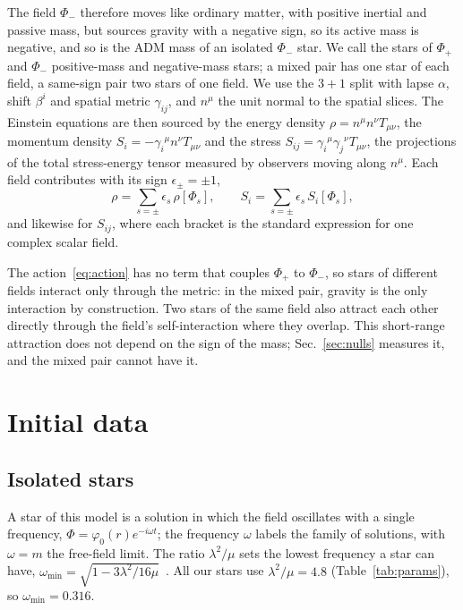 \documentclass[twocolumn,floatfix,aps,prd,superscriptaddress,nofootinbib]{revtex4-2}
\begin{document}
The field $\Phi_-$ therefore moves like ordinary matter, with positive inertial and passive mass, but sources gravity with a negative sign, so its active mass is negative, and so is the ADM mass of an isolated $\Phi_-$ star. We call the stars of $\Phi_+$ and $\Phi_-$ positive-mass and negative-mass stars; a mixed pair has one star of each field, a same-sign pair two stars of one field. We use the $3{+}1$ split with lapse $\alpha$, shift $\beta^i$ and spatial metric $\gamma_{ij}$, and $n^\mu$ the unit normal to the spatial slices. The Einstein equations are then sourced by the energy density $\rho=n^\mu n^\nu T_{\mu\nu}$, the momentum density $S_i=-\gamma_i{}^\mu n^\nu T_{\mu\nu}$ and the stress $S_{ij}=\gamma_i{}^\mu\gamma_j{}^\nu T_{\mu\nu}$, the projections of the total stress-energy tensor measured by observers moving along $n^\mu$. Each field contributes with its sign $\epsilon_\pm=\pm1$,
\begin{equation}
\rho=\sum_{s=\pm}\epsilon_s\,\rho[\Phi_s],\qquad
S_i=\sum_{s=\pm}\epsilon_s\,S_i[\Phi_s],
\label{eq:adm_sources}
\end{equation}
and likewise for $S_{ij}$, where each bracket is the standard expression for one complex scalar field.

The action~\eqref{eq:action} has no term that couples $\Phi_+$ to $\Phi_-$, so stars of different fields interact only through the metric: in the mixed pair, gravity is the only interaction by construction. Two stars of the same field also attract each other directly through the field's self-interaction where they overlap. This short-range attraction does not depend on the sign of the mass; Sec.~\ref{sec:nulls} measures it, and the mixed pair cannot have it.

\section{Initial data}
\label{sec:initialdata}

\subsection{Isolated stars}

A star of this model is a solution in which the field oscillates with a single frequency, $\Phi=\varphi_0(r)e^{-i\omega t}$; the frequency $\omega$ labels the family of solutions, with $\omega=m$ the free-field limit. The ratio $\lambda^2/\mu$ sets the lowest frequency a star can have, $\omega_{\min}=\sqrt{1-3\lambda^2/16\mu}$~\cite{coleman1985}. All our stars use $\lambda^2/\mu=4.8$ (Table~\ref{tab:params}), so $\omega_{\min}=0.316$.
\end{document}
